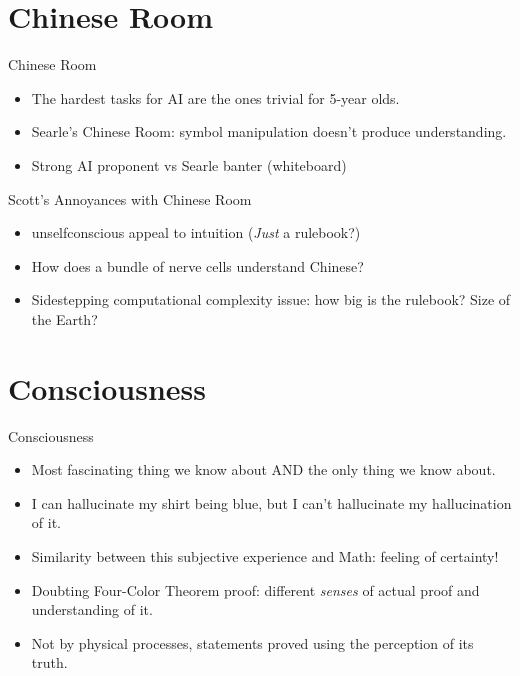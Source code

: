 \documentclass[
    11pt, %
    aspectratio=169, %
]{beamer}
\begin{document}
\section{Chinese Room}
\begin{frame}{Chinese Room}
\begin{itemize}
    \item The hardest tasks for AI are the ones trivial for 5-year olds.
    \item Searle's Chinese Room: symbol manipulation doesn't produce understanding.
    \item Strong AI proponent vs Searle banter (whiteboard)
\end{itemize}
    
\end{frame}


\begin{frame}{Scott's Annoyances with Chinese Room}
    \begin{itemize}
        \item unselfconscious appeal to intuition (\textit{Just} a rulebook?)
        \item How does a bundle of nerve cells understand Chinese?
        \item Sidestepping computational complexity issue: how big is the rulebook? Size of the Earth?
    \end{itemize}
\end{frame}

\section{Consciousness}
\begin{frame}{Consciousness}
    \begin{itemize}
        \item Most fascinating thing we know about AND the only thing we know about.
        \item I can hallucinate my shirt being blue, but I can't hallucinate my hallucination of it.
        \item Similarity between this subjective experience and Math: feeling of certainty!
        \item Doubting Four-Color Theorem proof: different \textit{senses} of actual proof and understanding of it.
        \item Not by physical processes, statements proved using the perception of its truth.
    \end{itemize}
\end{frame}
\end{document}
